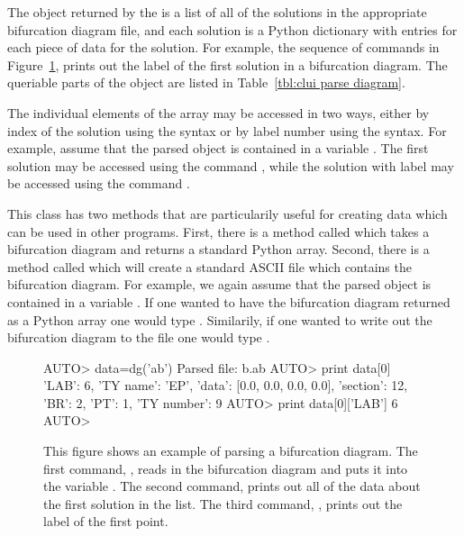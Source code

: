 The object returned by the  
is a list of all of the solutions in the appropriate
bifurcation diagram file, and each solution is a Python
dictionary with entries for each piece of
data for the solution.  For example, the sequence of commands
in Figure~\ref{exa:clui parse diagram}, prints out the
label of the first solution in a bifurcation diagram.
The queriable parts of the object are listed in
Table~\ref{tbl:clui parse diagram}.

The individual elements of the array may be accessed 
in two ways, either by index of the solution using the
\commandf{[]} syntax or by label number using the
\commandf{()} syntax.  For example, assume that the parsed object is contained
in a variable .  
The first solution may be accessed 
using the command , while the solution with
label  may be accessed using the command .

This class has two methods that are particularily useful for creating
data which can be used in other programs.  First, there is a method
called  which takes a bifurcation diagram and
returns a standard Python array.  Second, there is a method called
 which will create a standard ASCII file
which contains the bifurcation diagram.  For example, we again assume
that the parsed object is contained in a variable .  If
one wanted to have the bifurcation diagram returned as a Python array
one would type .  Similarily, if one wanted
to write out the bifurcation diagram to the file 
one would type .

\begin{figure}[htbp]
{\small \begin{center} \begin{boxedverbatim}
AUTO> data=dg('ab')
Parsed file: b.ab
AUTO> print data[0]
{'LAB': 6, 'TY name': 'EP', 'data': [0.0, 0.0, 0.0, 0.0], 'section': 12, 
'BR': 2, 'PT': 1, 'TY number': 9}
AUTO> print data[0]['LAB']
6
AUTO> 
\end{boxedverbatim}
\end{center} 
}
\caption[An example of parsing a bifurcation diagram.]
{This figure shows an example of parsing a bifurcation diagram.
The first command, , reads in the bifurcation
diagram and puts it into the variable .
The second command,  prints out all of
the data about the first solution in the list.
The third command, , prints
out the label of the first point.
}
\label{exa:clui parse diagram}
\end{figure}

